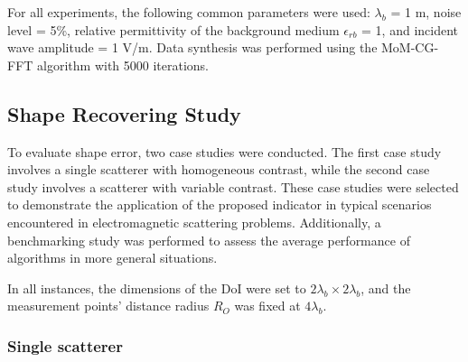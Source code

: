 \documentclass{IEEEtran}
\begin{document}
        For all experiments, the following common parameters were used: $\lambda_b$ = 1 m, noise level = 5\%, relative permittivity of the background medium $\epsilon_{rb}$ = 1, and incident wave amplitude = 1 V/m. Data synthesis was performed using the MoM-CG-FFT algorithm \cite{su1987calculation} with 5000 iterations.
	
		\subsection{Shape Recovering Study}\label{sec:results:shape}
		

            To evaluate shape error, two case studies were conducted. The first case study involves a single scatterer with homogeneous contrast, while the second case study involves a scatterer with variable contrast. These case studies were selected to demonstrate the application of the proposed indicator in typical scenarios encountered in electromagnetic scattering problems. Additionally, a benchmarking study was performed to assess the average performance of algorithms in more general situations.
			

            In all instances, the dimensions of the DoI were set to $2\lambda_b\times2\lambda_b$, and the measurement points' distance radius $R_O$ was fixed at $4\lambda_b$.

			\subsubsection{Single scatterer}\label{sec:results:shape:star}
\end{document}
